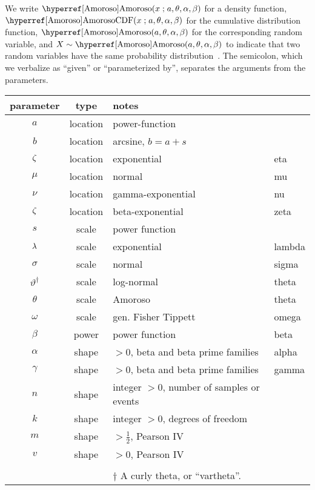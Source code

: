 


\label{sec:notation}

We write $\opr{Amoroso}(x\given a, \theta, \alpha, \beta)$ for a density function, $\oprr{AmorosoCDF}{Amoroso}(x\given a, \theta, \alpha, \beta)$ for the cumulative distribution function, $\opr{Amoroso}(a, \theta, \alpha, \beta)$ for the corresponding random variable, and $X\sim\opr{Amoroso}(a, \theta, \alpha, \beta)$ to indicate that two random variables have the same probability distribution~\cite{Gelman2004}. The semicolon, which we verbalize as ``given'' or ``parameterized by'', separates the arguments from the parameters. 

\begin{center}
\begin{tabular}{ccll}
parameter  & type &  notes\\
\hline
$a$			&location& power-function \\
$b$			&location& arcsine, $b= a+s$\\
$\zeta$		 & location &	exponential & eta\\
$\mu$		 & location & normal & mu\\
$\nu$  & location & gamma-exponential & nu\\
$\zeta$  & location & beta-exponential & zeta\\
$s$			&scale& power function\\
$\lambda$ 		 & scale & 		exponential & lambda\\
$\sigma$ 		 & scale	& normal & sigma\\
$\vartheta^\dagger$ & scale&	log-normal & theta\\
$\theta$ 		& scale & Amoroso & theta\\
$\omega$		 &scale& gen. Fisher Tippett & omega\\
$\beta$		 & power & power function	& beta \\
$\alpha$ 		& shape	& $>0$, beta and beta prime families & alpha\\
$\gamma$ 	& shape	& $>0$, beta and beta prime families & gamma\\
$n$		 	 &  shape& integer $>0$, number of samples or events \hspace{-2em} \\
$k$	 & shape	& integer $>0$, degrees of freedom\\%
$m$    		& shape & $>\tfrac{1}{2}$, Pearson IV\\
$v$			& shape & $>0$, Pearson IV\\ %
\\
&& \footnotesize{$\dagger$ A curly theta, or ``vartheta''.}
\end{tabular}
\end{center}


